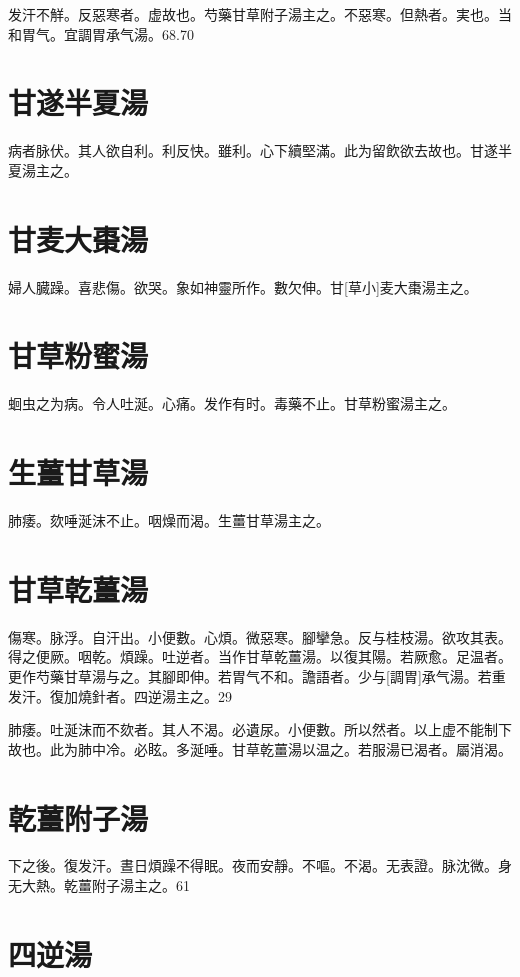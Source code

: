 \documentclass[12pt,oneside,UTF8,b5paper]{ctexbook}她她她她她她她
\begin{document}
发汗不觧。反惡寒者。虚故也。芍藥甘草附子湯主之。不惡寒。但熱者。実也。当和胃气。宜調胃承气湯。68.70

\section{甘遂半夏湯}

病者脉伏。其人欲自利。利反快。雖利。心下續堅滿。此为留飲欲去故也。甘遂半夏湯主之。

\section{甘麦大棗湯}

婦人臓躁。喜悲傷。欲哭。象如神靈所作。數欠伸。甘[草小]麦大棗湯主之。

\section{甘草粉蜜湯}

蛔虫之为病。令人吐涎。心痛。发作有时。毒藥不止。甘草粉蜜湯主之。

\section{生薑甘草湯}

肺痿。欬唾涎沫不止。咽燥而渴。生薑甘草湯主之。

\section{甘草乾薑湯}

傷寒。脉浮。自汗出。小便數。心煩。微惡寒。腳攣急。反与桂枝湯。欲攻其表。得之便厥。咽乾。煩躁。吐逆者。当作甘草乾薑湯。以復其陽。若厥愈。足温者。更作芍藥甘草湯与之。其腳即伸。若胃气不和。譫語者。少与[調胃]承气湯。若重发汗。復加燒針者。四逆湯主之。29

肺痿。吐涎沫而不欬者。其人不渴。必遺尿。小便數。所以然者。以上虚不能制下故也。此为肺中冷。必眩。多涎唾。甘草乾薑湯以温之。若服湯已渴者。屬消渴。

\section{乾薑附子湯}

下之後。復发汗。晝日煩躁不得眠。夜而安靜。不嘔。不渴。无表證。脉沈微。身无大熱。乾薑附子湯主之。61

\section{四逆湯}
\end{document}
